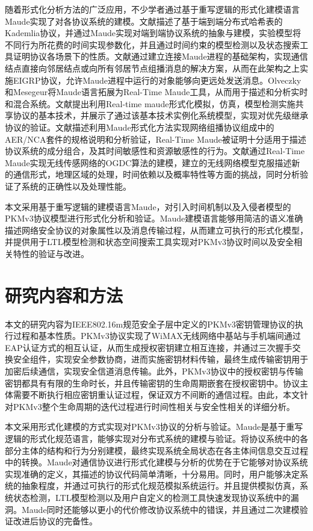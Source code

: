      随着形式化分析方法的广泛应用，不少学者通过基于重写逻辑的形式化建模语言Maude实现了对各协议系统的建模。文献\cite{Pita2015Specifying}描述了基于端到端分布式哈希表的Kademlia协议，并通过Maude实现对端到端协议系统的抽象与建模，实验模型将不同行为所花费的时间实现参数化，并且通过时间约束的模型检测以及状态搜索工具证明协议各场景下的性质。文献\cite{Rodr2007The}通过建立连接Maude进程的基础架构，实现通信结点直接向邻居结点或向所有邻居节点组播消息的解决方案，从而在此架构之上实施EIGRP协议，允许Maude进程中运行的对象能够向更远处发送消息。Olveczky和Mesegeur将Maude语言拓展为Real-Time Maude工具，从而用于描述和分析实时和混合系统。文献\cite{Olveczky2008Formal}提出利用Real-time maude形式化模拟，仿真，模型检测实施共享协议的基本技术，并展示了通过该基本技术实例化系统模型，实现对优先级继承协议的验证。文献\cite{Lveczky2001Specification}描述利用Maude形式化方法实现网络组播协议组成中的AER/NCA套件的规格说明和分析验证，Real-Time Maude被证明十分适用于描述协议系统的成分组合，及其时间敏感性和资源敏感性的行为。文献\cite{Lveczky2007Formal}通过Real-Time Maude实现无线传感网络的OGDC算法的建模，建立的无线网络模型克服描述新的通信形式，地理区域的处理，时间依赖以及概率特性等方面的挑战，同时分析验证了系统的正确性以及处理性能。

     本文采用基于重写逻辑的建模语言Maude，对引入时间机制以及入侵者模型的PKMv3协议模型进行形式化分析和验证。Maude建模语言能够用简洁的语义准确描述网络安全协议的对象属性以及消息传输过程，从而建立可执行的形式化模型，并提供用于LTL模型检测和状态空间搜索工具实现对PKMv3协议时间以及安全相关特性的验证与改进\cite{Clavel2008Maude}。

\section{研究内容和方法}

本文的研究内容为IEEE802.16m规范安全子层中定义的PKMv3密钥管理协议的执行过程和基本性质。PKMv3协议实现了WiMAX无线网络中基站与手机端间通过EAP认证方式的相互认证，从而生成授权密钥建立相互连接，并通过三次握手交换安全组件，实现安全参数协商，进而实施密钥材料传输，最终生成传输密钥用于加密后续通信，实现安全信道消息传输。此外，PKMv3协议中的授权密钥与传输密钥都具有有限的生命时长，并且传输密钥的生命周期嵌套在授权密钥中。协议主体需要不断执行相应密钥重认证过程，保证双方不间断的通信过程。由此，本文针对PKMv3整个生命周期的迭代过程进行时间性相关与安全性相关的详细分析。

本文采用形式化建模的方式实现对PKMv3协议的分析与验证。Maude是基于重写逻辑的形式化规范语言，能够实现对分布式系统的建模与验证。将协议系统中的各部分主体的结构和行为分别建模，最终实现系统全局状态在各主体间信息交互过程中的转换。Maude对通信协议进行形式化建模与分析的优势在于它能够对协议系统实现准确的定义，其描述的协议代码简单清晰，十分易用。同时，用户能够决定系统的抽象程度，并通过可执行的形式化规范模拟系统运行。并且提供模拟仿真，系统状态检测，LTL模型检测以及用户自定义的检测工具快速发现协议系统中的漏洞。Maude同时还能够以更小的代价修改协议系统中的错误，并且通过二次建模验证改进后协议的完备性。

